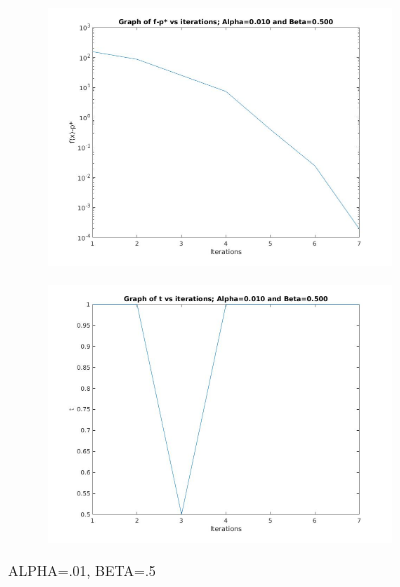 \documentclass[12pt]{article}
\begin{document}
\begin{figure}[ht]
    \centering
    \begin{subfigure}{0.4\textwidth} %
        \includegraphics[width=\textwidth]{newton_f_alpha_01_beta_50.jpg}
    \end{subfigure}
    \vspace{1em} %
    \begin{subfigure}{0.4\textwidth} %
        \includegraphics[width=\textwidth]{newton_t_alpha_01_beta_50.jpg}
    \end{subfigure}
    \caption{ALPHA=.01, BETA=.5} %
\end{figure}
\end{document}
